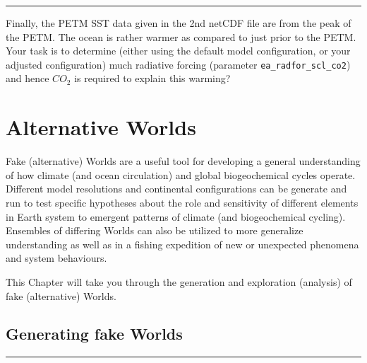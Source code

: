 \documentclass[11pt,fleqn]{book} %
\begin{document}
\vspace{1mm}
\noindent\rule{4cm}{0.1mm}
\vspace{2mm}

\noindent Finally, the PETM SST data given in the 2nd netCDF file are from the peak of the PETM. The ocean is rather warmer as compared to just prior to the PETM. Your task is to determine (either using the default model configuration, or your adjusted configuration) much radiative forcing (parameter \texttt{ea\_radfor\_scl\_co2}) and hence \(CO_{2}\) is required to explain this warming? 


\cleardoublepage


\chapter{Alternative Worlds}

\hfill \break

\noindent Fake (alternative) Worlds are a useful tool for developing a general understanding of how climate (and ocean circulation) and global biogeochemical cycles operate. Different model resolutions and continental configurations can be generate and run to test specific hypotheses about the role and sensitivity of different elements in Earth system to emergent patterns of climate (and biogeochemical cycling). Ensembles of differing Worlds can also be utilized to more generalize understanding as well as in a fishing expedition of new or unexpected phenomena and system behaviours.

This Chapter will take you through the generation and exploration (analysis) of fake (alternative) Worlds. 


\newpage

%
\section{Generating fake Worlds}


\vspace{1mm}
\noindent\rule{4cm}{0.5pt}
\vspace{2mm}
\end{document}
